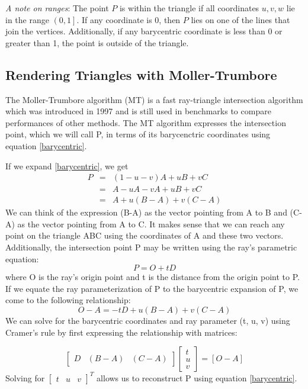 \documentclass{article}
\begin{document}
\textit{A note on ranges}: The point $P$ is within the triangle if all coordinates $u, v, w$ lie in the range $\left( 0, 1\right]$. If any coordinate is $0$, then $P$ lies on one of the lines that join the vertices. Additionally, if any barycentric coordinate is less than 0 or greater than 1, the point is outside of the triangle.   

\subsection{Rendering Triangles with Moller-Trumbore}
The Moller-Trumbore algorithm (MT) is a fast ray-triangle intersection algorithm which was introduced in 1997 and is still used in benchmarks to compare performances of other methods. The MT algorithm expresses the intersection point, which we will call P, in terms of its barycenctric coordinates using equation \eqref{barycentric}.

If we expand \eqref{barycentric}, we get
\begin{eqnarray*}
P &=& \left(1-u-v\right)A + uB + vC \\
&=& A - uA -vA + uB + vC \\
&=& A+u(B-A)+v(C-A)
\end{eqnarray*}
 We can think of the expression (B-A) as the vector pointing from A to B and (C-A) as the vector pointing from A to C. It makes sense that we can reach any point on the triangle ABC using the coordinates of A and these two vectors. \\
Additionally, the intersection point P may be written using the ray's parametric equation:
\begin{equation*}
    P = O + tD
\end{equation*}
where O is the ray's origin point and t is the distance from the origin point to P. If we equate the ray parameterization of P to the barycentric expansion of P, we come to the following relationship:
\begin{equation*}
    O - A = -tD + u(B-A) + v(C-A)
\end{equation*}
We can solve for the barycentric coordinates and ray parameter (t, u, v) using Cramer's rule by first expressing the relationship with matrices:

$$
\begin{bmatrix}
D & (B-A) & (C-A)
\end{bmatrix}
\begin{bmatrix}
t \\
u \\
v 
\end{bmatrix}
=
\left[ O-A \right]
$$
Solving for $\begin{bmatrix} t &u &v  \end{bmatrix} ^T$ allows us to reconstruct P using equation \eqref{barycentric}.
\end{document}
